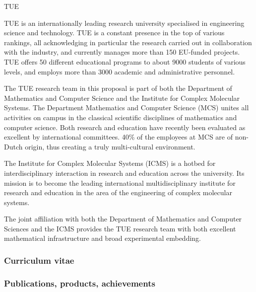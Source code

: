 \begin{sitedescription}{TUE}

TUE is an internationally leading research university specialised in engineering science and technology. TUE is a constant presence in the top of various rankings, all acknowledging in particular the research carried out in collaboration with the industry, and currently manages more than 150 EU-funded projects. TUE offers 50 different educational programs to about 9000 students of various levels, and employs more than 3000 academic and administrative personnel.

The TUE research team in this proposal is part of both the Department of Mathematics and Computer Science and the Institute for Complex Molecular Systems. 
The Department Mathematics and Computer Science (MCS) unites all activities on campus in the classical scientific disciplines of mathematics and computer science. Both research and education have recently been evaluated as excellent by international committees. 40\% of the employees at MCS are of non-Dutch origin, thus creating a truly multi-cultural environment. 

The Institute for Complex Molecular Systems (ICMS) is a hotbed for interdisciplinary interaction in research and education across the university. Its mission is to become the leading international multidisciplinary institute for research and education in the area of the engineering of complex molecular systems.

The joint affiliation with both the Department of Mathematics and Computer Sciences and the ICMS provides the TUE research team with both excellent mathematical infrastructure and broad experimental embedding.


\subsubsection*{Curriculum vitae}





\subsubsection*{Publications, products, achievements}


\end{sitedescription}
